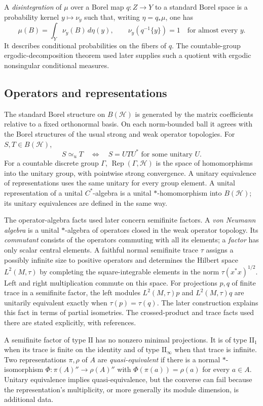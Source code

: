 \documentclass[11pt]{article}
\theoremstyle{definition}
\newcommand{\UE}{\mathrel{\simeq_u}}
\newcommand{\Rep}{\operatorname{Rep}}
\begin{document}
A \emph{disintegration} of $\mu$ over a Borel map $q:Z\to Y$ to a
standard Borel space is a probability kernel $y\mapsto\nu_y$ such that,
writing $\eta=q_*\mu$, one has
\[
 \mu(B)=\int_Y\nu_y(B)\,d\eta(y),\qquad
 \nu_y(q^{-1}\{y\})=1\quad\text{for almost every }y.
\]
It describes conditional probabilities on the fibers of $q$. The
countable-group ergodic-decomposition theorem used later supplies such
a quotient with ergodic nonsingular conditional measures.

\subsection{Operators and representations}
The standard Borel structure on $B(\mathcal H)$ is generated by the
matrix coefficients relative to a fixed orthonormal basis. On each
norm-bounded ball it agrees with the Borel structures of the usual
strong and weak operator topologies. For $S,T\in B(\mathcal H)$,
\[
 S\UE T\quad\Longleftrightarrow\quad
 S=UTU^*\text{ for some unitary }U.
\]
For a countable discrete group $\Gamma$, $\Rep(\Gamma,\mathcal H)$
is the space of homomorphisms into the unitary group, with pointwise
strong convergence. A unitary equivalence of representations uses the
same unitary for every group element. A unital representation of a
unital $C^*$-algebra is a unital $*$-homomorphism into $B(\mathcal H)$;
its unitary equivalences are defined in the same way.

The operator-algebra facts used later concern semifinite factors.
A \emph{von Neumann algebra} is a unital $*$-algebra of operators
closed in the weak operator topology. Its \emph{commutant} consists
of the operators commuting with all its elements; a \emph{factor}
has only scalar central elements. A faithful normal semifinite trace
$\tau$ assigns a possibly infinite size to positive operators and
determines the Hilbert space $L^2(M,\tau)$ by completing the
square-integrable elements in the norm $\tau(x^*x)^{1/2}$.
Left and right multiplication commute on this space.
For projections $p,q$ of finite trace in a semifinite factor,
the left modules $L^2(M,\tau)p$ and $L^2(M,\tau)q$ are unitarily
equivalent exactly when $\tau(p)=\tau(q)$. The later construction
explains this fact in terms of partial isometries. The crossed-product
and trace facts used there are stated explicitly, with references.

A semifinite factor of type $\mathrm{II}$ has no nonzero minimal
projections. It is of type $\mathrm{II}_1$ when its trace is finite on
the identity and of type $\mathrm{II}_\infty$ when that trace is infinite.
Two representations $\pi,\rho$ of $A$ are \emph{quasi-equivalent} if
there is a normal $*$-isomorphism
$\Phi:\pi(A)''\to\rho(A)''$ with $\Phi(\pi(a))=\rho(a)$ for every
$a\in A$. Unitary equivalence implies quasi-equivalence, but the
converse can fail because the representation's multiplicity, or more
generally its module dimension, is additional data.
\end{document}
